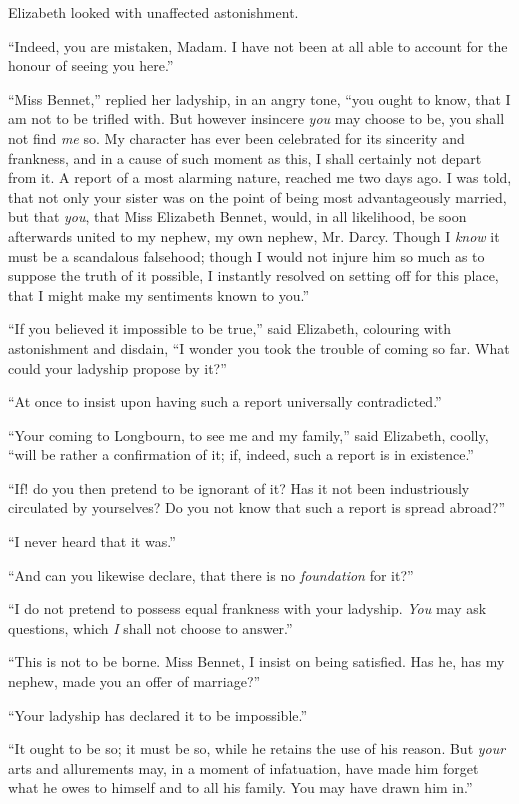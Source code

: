 Elizabeth looked with unaffected astonishment.

“Indeed, you are mistaken, Madam. I have not been
at all able to account for the honour of seeing you here.”

“Miss Bennet,” replied her ladyship, in an angry tone,
“you ought to know, that I am not to be trifled with.
But however insincere \textit{you} may choose to be, you shall
not find \textit{me} so. My character has ever been celebrated
for its sincerity and frankness, and in a cause of such
moment as this, I shall certainly not depart from it.
A report of a most alarming nature, reached me two days
ago. I was told, that not only your sister was on the
point of being most advantageously married, but that \textit{you},
that Miss Elizabeth Bennet, would, in all likelihood, be
soon afterwards united to my nephew, my own nephew,
Mr. Darcy. Though I \textit{know} it must be a scandalous
falsehood; though I would not injure him so much as
to suppose the truth of it possible, I instantly resolved
on setting off for this place, that I might make my sentiments
known to you.”

“If you believed it impossible to be true,” said Elizabeth,
colouring with astonishment and disdain, “I wonder you
took the trouble of coming so far. What could your
ladyship propose by it?”

“At once to insist upon having such a report universally
contradicted.”

“Your coming to Longbourn, to see me and my family,”
said Elizabeth, coolly, “will be rather a confirmation of
it; if, indeed, such a report is in existence.”

“If! do you then pretend to be ignorant of it? Has
it not been industriously circulated by yourselves? Do
you not know that such a report is spread abroad?”

“I never heard that it was.”

“And can you likewise declare, that there is no \textit{foundation}
for it?”

“I do not pretend to possess equal frankness with your
ladyship. \textit{You} may ask questions, which \textit{I} shall not choose
to answer.”

“This is not to be borne. Miss Bennet, I insist on being
satisfied. Has he, has my nephew, made you an offer of
marriage?”

“Your ladyship has declared it to be impossible.”

“It ought to be so; it must be so, while he retains the
use of his reason. But \textit{your} arts and allurements may,
in a moment of infatuation, have made him forget what
he owes to himself and to all his family. You may have
drawn him in.”

